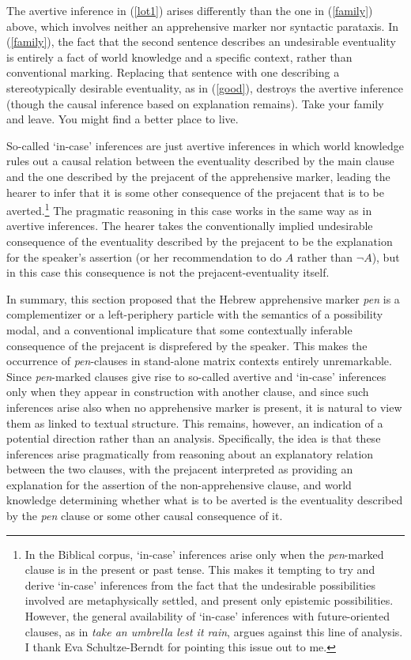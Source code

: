\documentclass[output=paper,colorlinks,citecolor=brown]{langscibook}
\begin{document}
The avertive inference in (\ref{lot1}) arises differently than the one in (\ref{family}) above, which involves neither an apprehensive marker nor syntactic parataxis. In (\ref{family}), the fact that the second sentence describes an undesirable eventuality is entirely a fact of world knowledge and a specific context, rather than conventional marking. Replacing that sentence with one describing a stereotypically desirable eventuality, as in (\ref{good}), destroys the avertive inference (though the causal inference based on explanation remains). 
\ea
\label{good}
Take your family and leave. You might find a better place to live. 
\z


So-called `in-case' inferences are just avertive inferences in which world knowledge rules out a causal relation between the eventuality described by the main clause and the one described by the prejacent of the apprehensive marker, leading the hearer to infer that it is some other consequence of the prejacent that is to be averted.\footnote{In the Biblical corpus, `in-case' inferences arise only when the \textit{pen}-marked clause is in the present or past tense. This makes it tempting to try and derive `in-case' inferences from the fact that the undesirable possibilities involved are metaphysically settled, and present only epistemic possibilities. However, the general availability of `in-case' inferences with future-oriented clauses, as in \textit{take an umbrella lest it rain}, argues against this line of analysis. I thank Eva Schultze-Berndt for pointing this issue out to me.} The pragmatic reasoning in this case works in the same way as in avertive inferences. The hearer takes the conventionally implied undesirable consequence of the eventuality described by the prejacent to be the explanation for the speaker's assertion (or her recommendation to do $A$ rather than $\neg A$), but in this case this consequence is not the prejacent-eventuality itself. 

In summary, this section proposed that the Hebrew apprehensive marker \textit{pen} is a complementizer or a left-periphery particle with the semantics of a possibility modal, and a conventional implicature that some contextually inferable consequence of the prejacent is disprefered by the speaker. This makes the occurrence of \textit{pen}-clauses in stand-alone matrix contexts entirely unremarkable. Since \textit{pen}-marked clauses give rise to so-called avertive and `in-case' inferences only when they appear in construction with another clause, and since such inferences arise also when no apprehensive marker is present, it is natural to view them as linked to textual structure. This remains, however, an indication of a potential direction rather than an analysis. Specifically, the idea is that these inferences arise pragmatically from reasoning about an explanatory relation between the two clauses, with the prejacent interpreted as providing an explanation for the assertion of the non-apprehensive clause, and world knowledge determining whether what is to be averted is the eventuality described by the \textit{pen} clause or some other causal consequence of it. 
\end{document}

